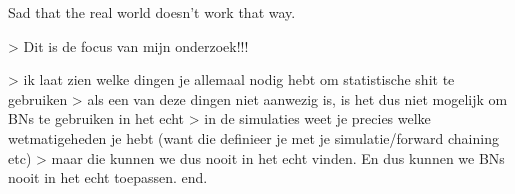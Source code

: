 Sad that the real world doesn't work that way.


> Dit is de focus van mijn onderzoek!!!

> ik laat zien welke dingen je allemaal nodig hebt om statistische shit te gebruiken
> als een van deze dingen niet aanwezig is, is het dus niet mogelijk om BNs te gebruiken in het echt
> in de simulaties weet je precies welke wetmatigeheden je hebt (want die definieer je met je simulatie/forward chaining etc)
> maar die kunnen we dus nooit in het echt vinden. En dus kunnen we BNs nooit in het echt toepassen. end.


